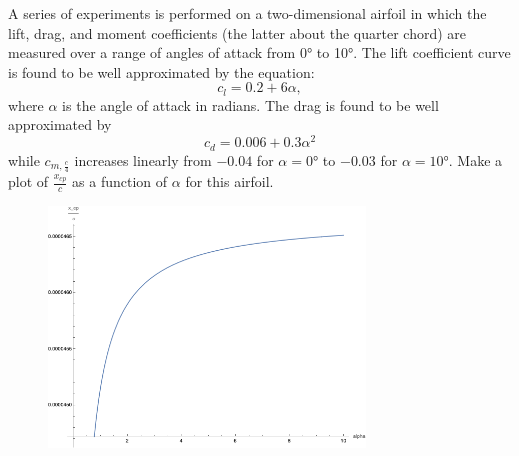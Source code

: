 \begin{homeworkProblem}

	A series of experiments is performed on a two-dimensional airfoil in which the lift, drag, and moment coefficients (the latter about the quarter chord) are measured over a range of angles of attack from \ang{0} to \ang{10}. The lift coefficient curve is found to be well approximated by the equation:
	\[
		c_l = 0.2 + 6 \alpha,
	\]
	where \( \alpha \) is the angle of attack in radians. The drag is found to be well approximated by
	\[
		c_d = 0.006 + 0.3\alpha^2
	\]
	while \( c_{m,\frac{c}{4}} \) increases linearly from \( -0.04 \) for \( \alpha = \ang{0} \) to \( -0.03 \) for \( \alpha = \ang{10} \). Make a plot of \( \frac{x_{cp}}{c} \) as a function of \( \alpha \) for this airfoil.

	\solution

	\begin{figure}[ht]
		\begin{center}
			\includegraphics[width=0.75\textwidth]{images/s2.png}
		\end{center}
	\end{figure}

\end{homeworkProblem}

